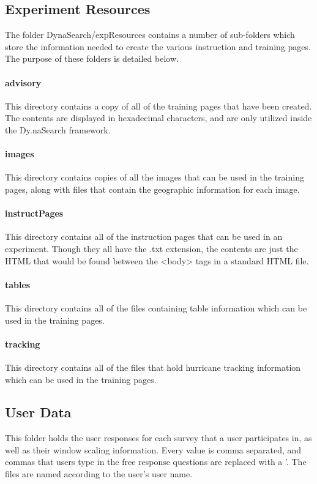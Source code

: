 \documentclass[article]{ij4uq}              %
\begin{document}
\subsection{Experiment Resources}
The folder DynaSearch/expResources contains a number of sub-folders which store the information needed to create the various instruction and training pages. The purpose of these folders is detailed below.

\paragraph{advisory}
This directory contains a copy of all of the training pages that have been created. The contents are displayed in hexadecimal characters, and are only utilized inside the Dy.naSearch framework.

\paragraph{images}
This directory contains copies of all the images that can be used in the training pages, along with files that contain the geographic information for each image.

\paragraph{instructPages}
This directory contains all of the instruction pages that can be used in an experiment. Though they all have the .txt extension, the contents are just the HTML that would be found between the <body> tags in a standard HTML file. 

\paragraph{tables}
This directory contains all of the files containing table information which can be used in the training pages.

\paragraph{tracking}
This directory contains all of the files that hold hurricane tracking information which can be used in the training pages.

\subsection{User Data}
This folder holds the user responses for each survey that a user participates in, as well as their window scaling information. Every value is comma separated, and commas that users type in the free response questions are replaced with a '. The files are named according to the user's user name.
\end{document}
